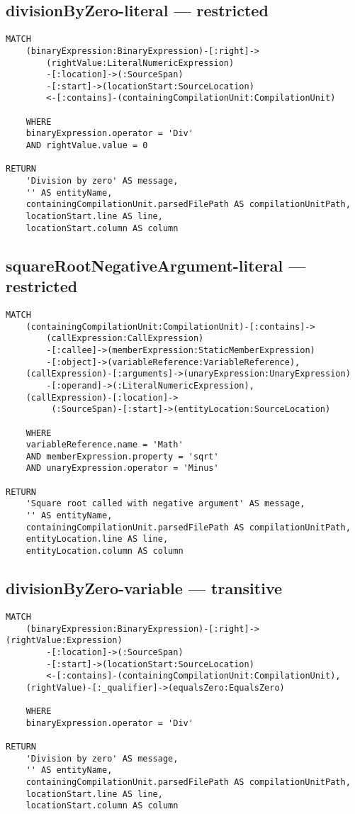 \newpage
\subsection{divisionByZero-literal — restricted}
\begin{lstlisting}[language=Cypher]
MATCH
    (binaryExpression:BinaryExpression)-[:right]->
        (rightValue:LiteralNumericExpression)
        -[:location]->(:SourceSpan)
        -[:start]->(locationStart:SourceLocation)
        <-[:contains]-(containingCompilationUnit:CompilationUnit)

    WHERE
    binaryExpression.operator = 'Div'
    AND rightValue.value = 0

RETURN
    'Division by zero' AS message,
    '' AS entityName,
    containingCompilationUnit.parsedFilePath AS compilationUnitPath,
    locationStart.line AS line,
    locationStart.column AS column
\end{lstlisting}


\newpage
\subsection{squareRootNegativeArgument-literal — restricted}
\begin{lstlisting}[language=Cypher]
MATCH
    (containingCompilationUnit:CompilationUnit)-[:contains]->
        (callExpression:CallExpression)
        -[:callee]->(memberExpression:StaticMemberExpression)
        -[:object]->(variableReference:VariableReference),
    (callExpression)-[:arguments]->(unaryExpression:UnaryExpression)
        -[:operand]->(:LiteralNumericExpression),
    (callExpression)-[:location]->
         (:SourceSpan)-[:start]->(entityLocation:SourceLocation)

    WHERE
    variableReference.name = 'Math'
    AND memberExpression.property = 'sqrt'
    AND unaryExpression.operator = 'Minus'

RETURN
    'Square root called with negative argument' AS message,
    '' AS entityName,
    containingCompilationUnit.parsedFilePath AS compilationUnitPath,
    entityLocation.line AS line,
    entityLocation.column AS column
\end{lstlisting}


\newpage
\subsection{divisionByZero-variable — transitive}
\begin{lstlisting}[language=Cypher]
MATCH
    (binaryExpression:BinaryExpression)-[:right]->(rightValue:Expression)
        -[:location]->(:SourceSpan)
        -[:start]->(locationStart:SourceLocation)
        <-[:contains]-(containingCompilationUnit:CompilationUnit),
    (rightValue)-[:_qualifier]->(equalsZero:EqualsZero)

    WHERE
    binaryExpression.operator = 'Div'

RETURN
    'Division by zero' AS message,
    '' AS entityName,
    containingCompilationUnit.parsedFilePath AS compilationUnitPath,
    locationStart.line AS line,
    locationStart.column AS column
\end{lstlisting}



